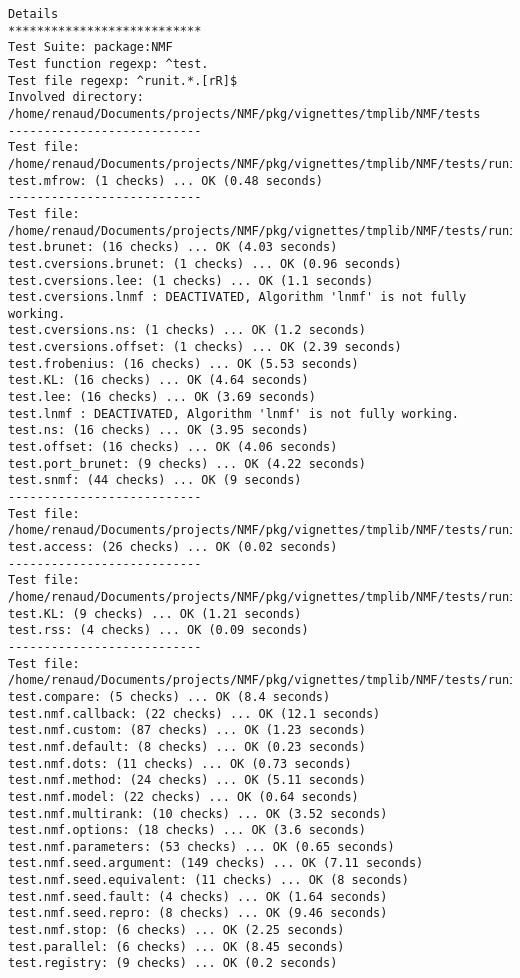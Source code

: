 \documentclass[10pt]{article}
\begin{document}
\begin{verbatim}
Details 
*************************** 
Test Suite: package:NMF 
Test function regexp: ^test. 
Test file regexp: ^runit.*.[rR]$ 
Involved directory: 
/home/renaud/Documents/projects/NMF/pkg/vignettes/tmplib/NMF/tests 
--------------------------- 
Test file: /home/renaud/Documents/projects/NMF/pkg/vignettes/tmplib/NMF/tests/runit.aheatmap.R 
test.mfrow: (1 checks) ... OK (0.48 seconds)
--------------------------- 
Test file: /home/renaud/Documents/projects/NMF/pkg/vignettes/tmplib/NMF/tests/runit.algorithms.r 
test.brunet: (16 checks) ... OK (4.03 seconds)
test.cversions.brunet: (1 checks) ... OK (0.96 seconds)
test.cversions.lee: (1 checks) ... OK (1.1 seconds)
test.cversions.lnmf : DEACTIVATED, Algorithm 'lnmf' is not fully working.
test.cversions.ns: (1 checks) ... OK (1.2 seconds)
test.cversions.offset: (1 checks) ... OK (2.39 seconds)
test.frobenius: (16 checks) ... OK (5.53 seconds)
test.KL: (16 checks) ... OK (4.64 seconds)
test.lee: (16 checks) ... OK (3.69 seconds)
test.lnmf : DEACTIVATED, Algorithm 'lnmf' is not fully working.
test.ns: (16 checks) ... OK (3.95 seconds)
test.offset: (16 checks) ... OK (4.06 seconds)
test.port_brunet: (9 checks) ... OK (4.22 seconds)
test.snmf: (44 checks) ... OK (9 seconds)
--------------------------- 
Test file: /home/renaud/Documents/projects/NMF/pkg/vignettes/tmplib/NMF/tests/runit.bioc.r 
test.access: (26 checks) ... OK (0.02 seconds)
--------------------------- 
Test file: /home/renaud/Documents/projects/NMF/pkg/vignettes/tmplib/NMF/tests/runit.distance.r 
test.KL: (9 checks) ... OK (1.21 seconds)
test.rss: (4 checks) ... OK (0.09 seconds)
--------------------------- 
Test file: /home/renaud/Documents/projects/NMF/pkg/vignettes/tmplib/NMF/tests/runit.interface.r 
test.compare: (5 checks) ... OK (8.4 seconds)
test.nmf.callback: (22 checks) ... OK (12.1 seconds)
test.nmf.custom: (87 checks) ... OK (1.23 seconds)
test.nmf.default: (8 checks) ... OK (0.23 seconds)
test.nmf.dots: (11 checks) ... OK (0.73 seconds)
test.nmf.method: (24 checks) ... OK (5.11 seconds)
test.nmf.model: (22 checks) ... OK (0.64 seconds)
test.nmf.multirank: (10 checks) ... OK (3.52 seconds)
test.nmf.options: (18 checks) ... OK (3.6 seconds)
test.nmf.parameters: (53 checks) ... OK (0.65 seconds)
test.nmf.seed.argument: (149 checks) ... OK (7.11 seconds)
test.nmf.seed.equivalent: (11 checks) ... OK (8 seconds)
test.nmf.seed.fault: (4 checks) ... OK (1.64 seconds)
test.nmf.seed.repro: (8 checks) ... OK (9.46 seconds)
test.nmf.stop: (6 checks) ... OK (2.25 seconds)
test.parallel: (6 checks) ... OK (8.45 seconds)
test.registry: (9 checks) ... OK (0.2 seconds)

\end{verbatim}
\end{document}
